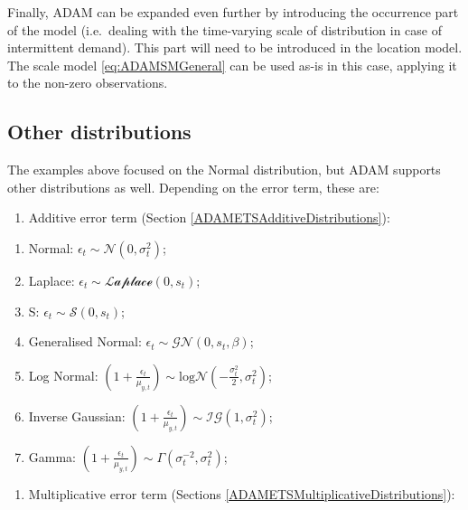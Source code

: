 \documentclass[]{book}
\providecommand{\tightlist}{%
  \setlength{\itemsep}{0pt}\setlength{\parskip}{0pt}}
\theoremstyle{definition}
\theoremstyle{definition}
\theoremstyle{definition}
\theoremstyle{definition}
\theoremstyle{remark}
\begin{document}
Finally, ADAM can be expanded even further by introducing the occurrence part of the model (i.e.~dealing with the time-varying scale of distribution in case of intermittent demand). This part will need to be introduced in the location model. The scale model \eqref{eq:ADAMSMGeneral} can be used as-is in this case, applying it to the non-zero observations.

\hypertarget{SMDistributions}{%
\subsection{Other distributions}\label{SMDistributions}}

The examples above focused on the Normal distribution, but ADAM supports other distributions as well. Depending on the error term, these are:

\begin{enumerate}
\def\labelenumi{\arabic{enumi}.}
\tightlist
\item
  Additive error term (Section \ref{ADAMETSAdditiveDistributions}):
\end{enumerate}

\begin{enumerate}
\def\labelenumi{\alph{enumi}.}
\tightlist
\item
  Normal: \(\epsilon_t \sim \mathcal{N}(0, \sigma_t^2)\);
\item
  Laplace: \(\epsilon_t \sim \mathcal{Laplace}(0, s_t)\);
\item
  S: \(\epsilon_t \sim \mathcal{S}(0, s_t)\);
\item
  Generalised Normal: \(\epsilon_t \sim \mathcal{GN}(0, s_t, \beta)\);
\item
  Log Normal: \(\left(1+\frac{\epsilon_t}{\mu_{y,t}} \right) \sim \text{log}\mathcal{N}\left(-\frac{\sigma_t^2}{2}, \sigma_t^2\right)\);
\item
  Inverse Gaussian: \(\left(1+\frac{\epsilon_t}{\mu_{y,t}} \right) \sim \mathcal{IG}(1, \sigma_t^2)\);
\item
  Gamma: \(\left(1+\frac{\epsilon_t}{\mu_{y,t}} \right) \sim \mathcal{\Gamma}(\sigma_t^{-2}, \sigma_t^2)\);
\end{enumerate}

\begin{enumerate}
\def\labelenumi{\arabic{enumi}.}
\setcounter{enumi}{1}
\tightlist
\item
  Multiplicative error term (Sections \ref{ADAMETSMultiplicativeDistributions}):
\end{enumerate}
\end{document}
